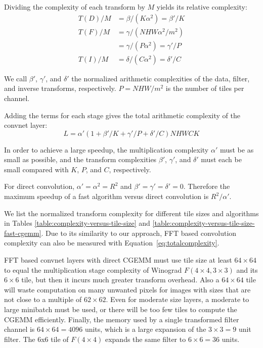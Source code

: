 \documentclass[10pt,twocolumn,letterpaper]{article}
\begin{document}
Dividing the complexity of each transform by $M$ yields its relative complexity:
\begin{equation}
\begin{split}
T(D)/M &= \beta/(K \alpha^2) = \beta'/K \\
T(F)/M &= \gamma/(NHW\alpha^2/m^2) \\ 
       &= \gamma/(P\alpha^2) = \gamma'/P \\
T(I)/M &= \delta/(C\alpha^2) = \delta'/C
\end{split}
\end{equation}
 
We call $\beta'$, $\gamma'$, and $\delta'$ the normalized arithmetic complexities of the data, filter, and inverse transforms, respectively. $P=NHW/m^2$ is the number of tiles per channel.
 
Adding the terms for each stage gives the total arithmetic complexity of the convnet layer:
\begin{equation}
L = \alpha' (1 + \beta'/K + \gamma'/P + \delta'/C) NHWCK
\label{eq:totalcomplexity}
\end{equation}
  
In order to achieve a large speedup, the multiplication complexity $\alpha'$ must be as small as possible, and the transform complexities $\beta'$, $\gamma'$, and $\delta'$ must each be small compared with $K$, $P$, and $C$, respectively.
 
For direct convolution, $\alpha' = \alpha^2 = R^2$ and $\beta'=\gamma'=\delta'=0$. Therefore the maximum speedup of a fast algorithm versus direct convolution is $R^2/\alpha'$.

We list the normalized transform complexity for different tile sizes and algorithms in Tables \ref{table:complexity-versus-tile-size} and \ref{table:complexity-versus-tile-size-fast-cgemm}. Due to its similarity to our approach, FFT based convolution complexity can also be measured with Equation~\ref{eq:totalcomplexity}.

FFT based convnet layers with direct CGEMM must use tile size at least $64 \times 64$ to equal the multiplication stage complexity of Winograd $F(4 \times 4, 3 \times 3)$ and its $6 \times 6$ tile, but then it incurs much greater transform overhead. Also a $64 \times 64$ tile will waste computation on many unwanted pixels for images with sizes that are not close to a multiple of $62 \times 62$. Even for moderate size layers, a moderate to large minibatch must be used, or there will be too few tiles to compute the CGEMM efficiently. Finally, the memory used by a single transformed filter channel is $64 \times 64 = 4096$ units, which is a large expansion of the $3 \times 3 = 9$ unit filter. The 6x6 tile of $F(4 \times 4)$ expands the same filter to $6 \times 6 = 36$ units.
\end{document}

